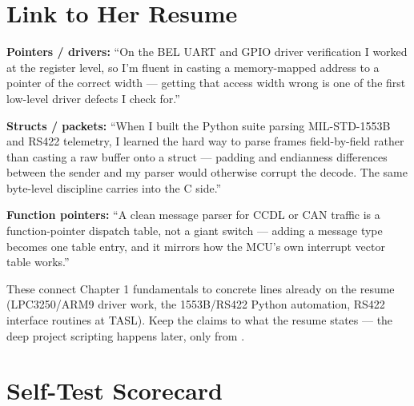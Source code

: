 \section{Link to Her Resume}

\begin{resumelink}
\textbf{Pointers / drivers:} ``On the BEL UART and GPIO driver verification I
worked at the register level, so I'm fluent in casting a memory-mapped
address to a  pointer of the correct width --- getting that
access width wrong is one of the first low-level driver defects I check
for.''

\medskip
\textbf{Structs / packets:} ``When I built the Python suite parsing
MIL-STD-1553B and RS422 telemetry, I learned the hard way to parse frames
field-by-field rather than casting a raw buffer onto a struct --- padding and
endianness differences between the sender and my parser would otherwise
corrupt the decode. The same byte-level discipline carries into the C side.''

\medskip
\textbf{Function pointers:} ``A clean message parser for CCDL or CAN traffic
is a function-pointer dispatch table, not a giant switch --- adding a message
type becomes one table entry, and it mirrors how the MCU's own interrupt
vector table works.''

\medskip
\small These connect Chapter 1 fundamentals to concrete lines already on the
resume (LPC3250/ARM9 driver work, the 1553B/RS422 Python automation, RS422
interface routines at TASL). Keep the claims to what the resume states ---
the deep project scripting happens later, only from .
\end{resumelink}

\section{Self-Test Scorecard}

